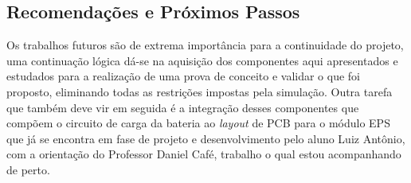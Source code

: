 \subsection*{Recomendações e Próximos Passos}

Os trabalhos futuros são de extrema importância para a continuidade do projeto, uma continuação lógica dá-se na aquisição dos componentes aqui apresentados e estudados para a realização de uma prova de conceito e validar o que foi proposto, eliminando todas as restrições impostas pela simulação. Outra tarefa que também deve vir em seguida é a integração desses componentes que compõem o circuito de carga da bateria ao \textit{layout} de PCB para o módulo EPS que já se encontra em fase de projeto e desenvolvimento pelo aluno Luiz Antônio, com a orientação do Professor Daniel Café, trabalho o qual estou acompanhando de perto.

